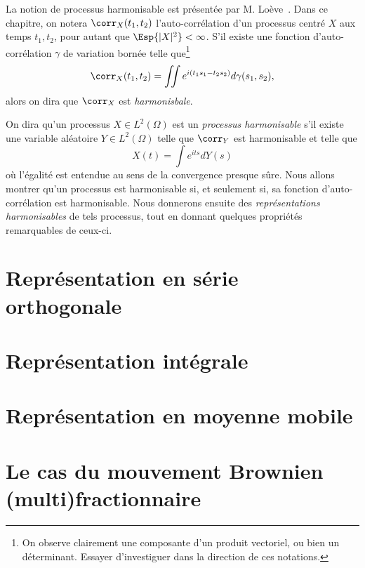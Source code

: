 
La notion de processus harmonisable est présentée par
M. Loève~\cite{loeve1945}. Dans ce chapitre, on notera
$\corr_X(t_1,t_2)$ l'auto-corrélation d'un processus centré $X$ aux
temps $t_1, t_2$, pour autant que $\Esp{|X|^2} < \infty$. S'il existe
une fonction d'auto-corrélation $\gamma$ de variation bornée telle
que\footnote{On observe clairement une composante d'un produit
vectoriel, ou bien un déterminant. Essayer d'investiguer dans la
direction de ces notations.}  \[ \corr_X(t_1,t_2) = \iint e^{i(t_1s_1
- t_2s_2)} d\gamma(s_1,s_2) ,\] alors on dira que $\corr_X$ est
\emph{harmonisbale}.


On dira qu'un processus $X\in L^2(\Omega)$ est un \emph{processus
  harmonisable} s'il existe une variable aléatoire $Y\in L^2(\Omega)$
telle que $\corr_Y$ est harmonisable et telle que
\[ X(t) = \int e^{its} dY(s) \] où l'égalité est entendue au sens de
la convergence presque sûre. Nous allons montrer qu'un processus est
harmonisable si, et seulement si, sa fonction d'auto-corrélation est
harmonisable. Nous donnerons ensuite des \emph{représentations
  harmonisables} de tels processus, tout en donnant quelques
propriétés remarquables de ceux-ci.


\section{Représentation en série orthogonale}
\section{Représentation intégrale}
\section{Représentation en moyenne mobile}
\section{Le cas du mouvement Brownien (multi)fractionnaire}
